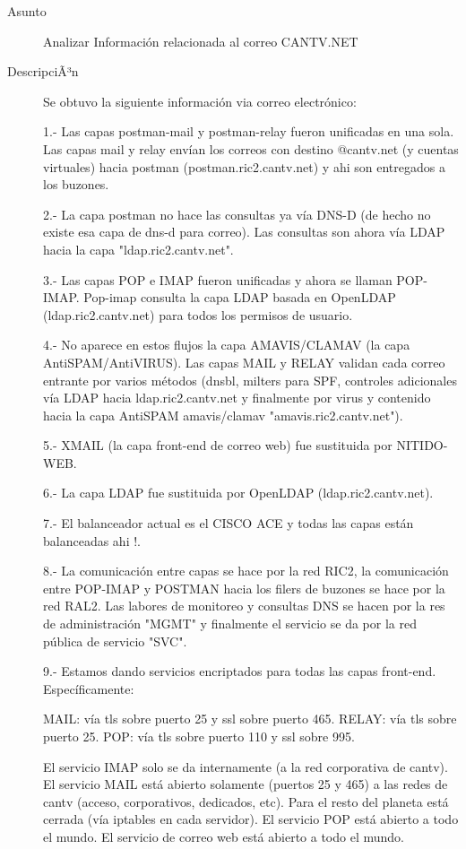 \begin{description}

\item[Asunto] Analizar Información relacionada al correo CANTV.NET\item[DescripciÃ³n] Se obtuvo la siguiente información via correo electrónico:

1.- Las capas postman-mail y postman-relay fueron unificadas en una
sola. Las capas mail y relay envían los correos con destino @cantv.net
(y cuentas virtuales) hacia postman (postman.ric2.cantv.net) y ahi son
entregados a los buzones.

2.- La capa postman no hace las consultas ya vía DNS-D (de hecho no
existe esa capa de dns-d para correo). Las consultas son ahora vía LDAP
hacia la capa "ldap.ric2.cantv.net".

3.- Las capas POP e IMAP fueron unificadas y ahora se llaman POP-IMAP.
Pop-imap consulta la capa LDAP basada en OpenLDAP (ldap.ric2.cantv.net)
para todos los permisos de usuario.

4.- No aparece en estos flujos la capa AMAVIS/CLAMAV (la capa
AntiSPAM/AntiVIRUS). Las capas MAIL y RELAY validan cada correo entrante
por varios métodos (dnsbl, milters para SPF, controles adicionales vía
LDAP hacia ldap.ric2.cantv.net y finalmente por virus y contenido hacia
la capa AntiSPAM amavis/clamav "amavis.ric2.cantv.net").

5.- XMAIL (la capa front-end de correo web) fue sustituida por NITIDO-WEB.

6.- La capa LDAP fue sustituida por OpenLDAP (ldap.ric2.cantv.net).

7.- El balanceador actual es el CISCO ACE y todas las capas están
balanceadas ahi !.

8.- La comunicación entre capas se hace por la red RIC2, la comunicación
entre POP-IMAP y POSTMAN hacia los filers de buzones se hace por la red
RAL2. Las labores de monitoreo y consultas DNS se hacen por la res de
administración "MGMT" y finalmente el servicio se da por la red pública
de servicio "SVC".

9.- Estamos dando servicios encriptados para todas las capas front-end.
Específicamente:

MAIL: vía tls sobre puerto 25 y ssl sobre puerto 465.
RELAY: vía tls sobre puerto 25.
POP: vía tls sobre puerto 110 y ssl sobre 995.

El servicio IMAP solo se da internamente (a la red corporativa de cantv).
El servicio MAIL está abierto solamente (puertos 25 y 465) a las redes
de cantv (acceso, corporativos, dedicados, etc). Para el resto del
planeta está cerrada (vía iptables en cada servidor).
El servicio POP está abierto a todo el mundo.
El servicio de correo web está abierto a todo el mundo.


\end{description}
